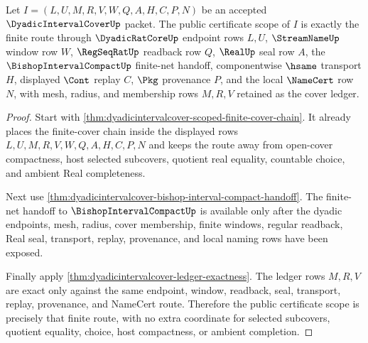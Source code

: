 \begin{theorem}
\label{thm:dyadicintervalcover-public-certificate-scope}
Let $I=(L,U,M,R,V,W,Q,A,H,C,P,N)$ be an accepted $\DyadicIntervalCoverUp$ packet. The public certificate scope of $I$ is exactly the finite route through $\DyadicRatCoreUp$ endpoint rows $L,U$, $\StreamNameUp$ window row $W$, $\RegSeqRatUp$ readback row $Q$, $\RealUp$ seal row $A$, the $\BishopIntervalCompactUp$ finite-net handoff, componentwise $\hsame$ transport $H$, displayed $\Cont$ replay $C$, $\Pkg$ provenance $P$, and the local $\NameCert$ row $N$, with mesh, radius, and membership rows $M,R,V$ retained as the cover ledger.
\end{theorem}
\begin{proof}
Start with \autoref{thm:dyadicintervalcover-scoped-finite-cover-chain}. It already places the finite-cover chain inside the displayed rows $L,U,M,R,V,W,Q,A,H,C,P,N$ and keeps the route away from open-cover compactness, host selected subcovers, quotient real equality, countable choice, and ambient Real completeness.

Next use \autoref{thm:dyadicintervalcover-bishop-interval-compact-handoff}. The finite-net handoff to $\BishopIntervalCompactUp$ is available only after the dyadic endpoints, mesh, radius, cover membership, finite windows, regular readback, Real seal, transport, replay, provenance, and local naming rows have been exposed.

Finally apply \autoref{thm:dyadicintervalcover-ledger-exactness}. The ledger rows $M,R,V$ are exact only against the same endpoint, window, readback, seal, transport, replay, provenance, and NameCert route. Therefore the public certificate scope is precisely that finite route, with no extra coordinate for selected subcovers, quotient equality, choice, host compactness, or ambient completion.
\end{proof}


